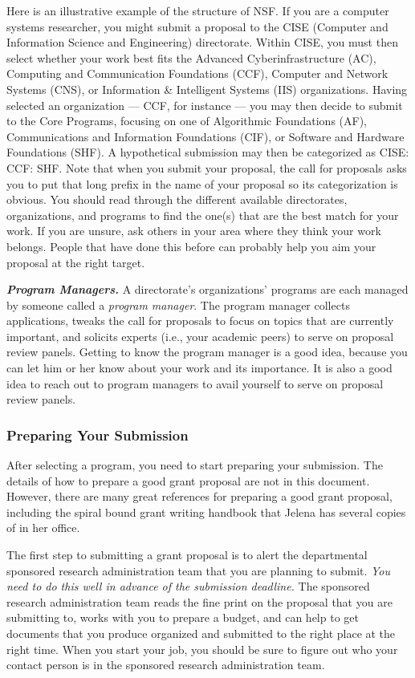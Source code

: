 Here is an illustrative example of the structure of NSF. If you are a computer
systems researcher, you might submit a proposal to the CISE (Computer and
Information Science and Engineering) directorate.  Within CISE, you must then
select whether your work best fits the Advanced Cyberinfrastructure (AC),
Computing and Communication Foundations (CCF), Computer and Network Systems
(CNS), or Information \& Intelligent Systems (IIS) organizations.  Having
selected an organization --- CCF, for instance --- you may then decide to
submit to the Core Programs, focusing on one of Algorithmic Foundations (AF),
Communications and Information Foundations (CIF), or Software and Hardware
Foundations (SHF).  A hypothetical submission may then be categorized as CISE:
CCF: SHF.  Note that when you submit your proposal, the call for proposals asks
you to put that long prefix in the name of your proposal so its categorization
is obvious.  You should read through the different available directorates,
organizations, and programs to find the one(s) that are the best match for your
work.  If you are unsure, ask others in your area where they think your work
belongs.  People that have done this before can probably help you aim your
proposal at the right target.

{\noindent \em \bf Program Managers.}
A directorate's organizations' programs are each managed by someone called a
{\em program manager}.  The program manager collects applications, tweaks the
call for proposals to focus on topics that are currently important, and
solicits experts (i.e., your academic peers) to serve on proposal review
panels.  Getting to know the program manager is a good idea, because you can
let him or her know about your work and its importance.  It is also a good idea
to reach out to program managers to avail yourself to serve on proposal review
panels.  

\subsubsection{Preparing Your Submission}
After selecting a program, you need to start preparing your submission.  The
details of how to prepare a good grant proposal are not in this document.
However, there are many great references for preparing a good grant proposal,
including the spiral bound grant writing handbook that Jelena has several
copies of in her office.

The first step to submitting a grant proposal is to alert the departmental
sponsored research administration team that you are planning to submit.  {\em
You need to do this well in advance of the submission deadline.}  The sponsored
research administration team reads the fine print on the proposal that you are
submitting to, works with you to prepare a budget, and can help to get
documents that you produce organized and submitted to the right place at the
right time.  When you start your job, you should be sure to figure out who your
contact person is in the sponsored research administration team. 

